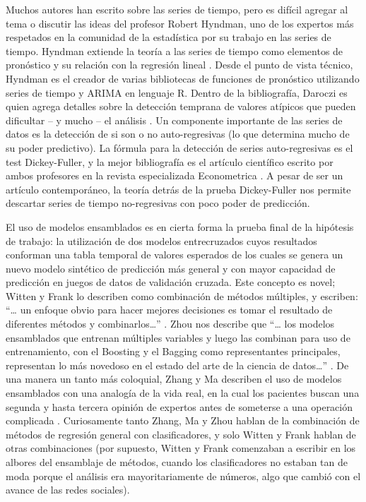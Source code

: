 Muchos autores han escrito sobre las series de tiempo, pero es difícil agregar al tema o discutir las ideas del profesor Robert Hyndman, uno de los expertos más respetados en la comunidad de la estadística por su trabajo en las series de tiempo. Hyndman extiende la teoría a las series de tiempo como elementos de pronóstico y su relación con la regresión lineal \cite{hyndman}. Desde el punto de vista técnico, Hyndman es el creador de varias bibliotecas de funciones de pronóstico utilizando series de tiempo y ARIMA en lenguaje R. Dentro de la bibliografía, Daroczi es quien agrega detalles sobre la detección temprana de valores atípicos que pueden dificultar – y mucho – el análisis \cite{daroczi}. Un componente importante de las series de datos es la detección de si son o no auto-regresivas (lo que determina mucho de su poder predictivo). La fórmula para la detección de series auto-regresivas es el test Dickey-Fuller, y la mejor bibliografía es el artículo científico escrito por ambos profesores en la revista especializada Econometrica \cite{dickeyfuller}. A pesar de ser un artículo contemporáneo, la teoría detrás de la prueba Dickey-Fuller nos permite descartar series de tiempo no-regresivas con poco poder de predicción.
 
El uso de modelos ensamblados es en cierta forma la prueba final de la hipótesis de trabajo: la utilización de dos modelos entrecruzados cuyos resultados conforman una tabla temporal de valores esperados de los cuales se genera un nuevo modelo sintético de predicción más general y con mayor capacidad de predicción en juegos de datos de validación cruzada. Este concepto es novel; Witten y Frank lo describen como combinación de métodos múltiples, y escriben: “… un enfoque obvio para hacer mejores decisiones es tomar el resultado de diferentes métodos y combinarlos…” \cite{datamining}. Zhou nos describe que “… los modelos ensamblados que entrenan múltiples variables y luego las combinan para uso de entrenamiento, con el Boosting y el Bagging como representantes principales, representan lo más novedoso en el estado del arte de la ciencia de datos…” \cite[pag. 5]{ensembleMethods}. De una manera un tanto más coloquial, Zhang y Ma describen el uso de modelos ensamblados con una analogía de la vida real, en la cual los pacientes buscan una segunda y hasta tercera opinión de expertos antes de someterse a una operación complicada \cite{ensembleMachineLearning}. Curiosamente tanto Zhang, Ma y Zhou hablan de la combinación de métodos de regresión general con clasificadores, y solo Witten y Frank hablan de otras combinaciones (por supuesto, Witten y Frank comenzaban a escribir en los albores del ensamblaje de métodos, cuando los clasificadores no estaban tan de moda porque el análisis era mayoritariamente de números, algo que cambió con el avance de las redes sociales).

